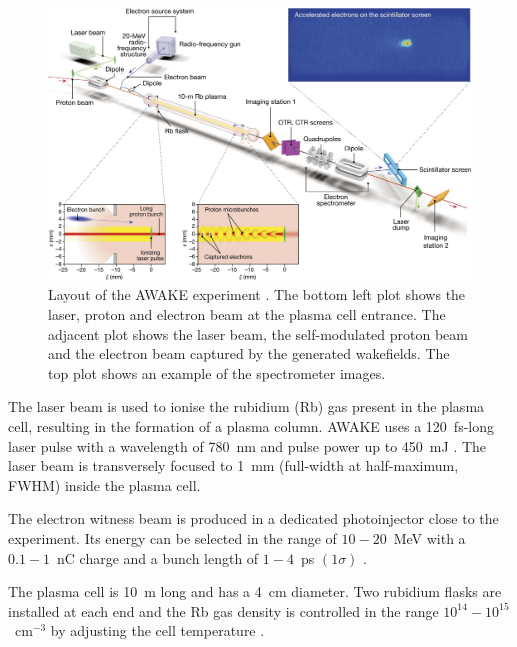 \begin{landscape}
\begin{figure}
\centering
\includegraphics[width=18cm, keepaspectratio]{pictures/awake_layout}
\caption{Layout of the AWAKE experiment \cite{Adli:2018end}. The bottom left plot shows the laser, proton and electron beam at the plasma cell entrance. The adjacent plot shows the laser beam, the self-modulated proton beam and the electron beam captured by the generated wakefields. The top plot shows an example of the spectrometer images.}
\label{fig:awake_layout}
\end{figure}
\end{landscape}





The laser beam is used to ionise the rubidium (Rb) gas present in the plasma cell, resulting in the formation of a plasma column. AWAKE uses a 120~fs-long laser pulse with a wavelength of 780~nm and pulse power up to 450~mJ \cite{Fedosseev:2016ccm}. The laser beam is transversely focused to 1~mm (full-width at half-maximum, FWHM) inside the plasma cell.

The electron witness beam is produced in a dedicated photoinjector close to the experiment. Its energy can be selected in the range of $10-20$~MeV with a $0.1-1$~nC charge and a bunch length of $1-4$~ps $(1\sigma)$ \cite{Pepitone:2018gwl, Kim:2706086}.

The plasma cell is 10~m long and has a 4~cm diameter. Two rubidium flasks are installed at each end and the Rb gas density is controlled in the range $10^{14}-10^{15}$~cm$^{-3}$ by adjusting the cell temperature \cite{Plyushchev:2017kqg}.




